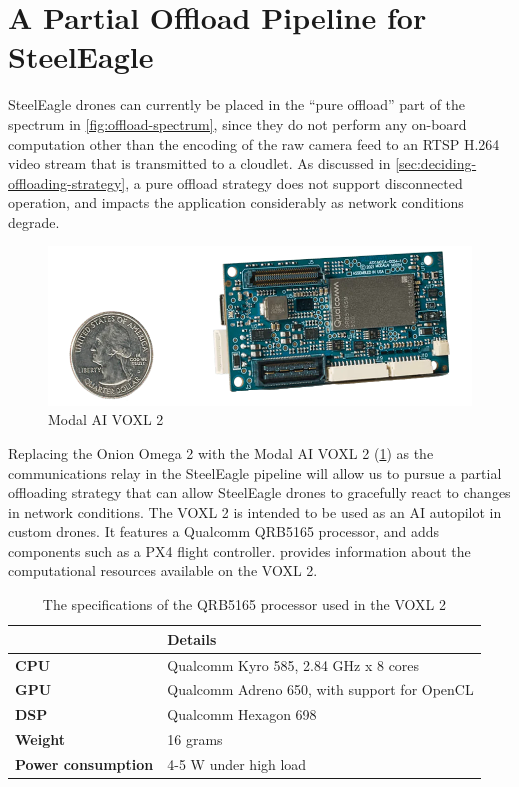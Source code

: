 \section{A Partial Offload Pipeline for SteelEagle}

SteelEagle drones can currently be placed in the ``pure offload'' part of the
spectrum in \cref{fig:offload-spectrum}, since they do not perform any on-board
computation other than the encoding of the raw camera feed to an RTSP H.264
video stream that is transmitted to a cloudlet. As discussed in
\cref{sec:deciding-offloading-strategy}, a pure offload strategy does not
support disconnected operation, and impacts the application considerably as
network conditions degrade.

\begin{figure}[htbp]
\centerline{\includegraphics[width = .5\textwidth]{figs/voxl2.png}}
\caption{Modal AI VOXL 2}
\label{fig:voxl2}
\end{figure}

Replacing the Onion Omega 2 with the Modal AI VOXL 2 (\cref{fig:voxl2}) as the
communications relay in the SteelEagle pipeline will allow us to pursue a
partial offloading strategy that can allow SteelEagle drones to gracefully
react to changes in network conditions. The VOXL 2 is intended to be used as an
AI autopilot in custom drones. It features a Qualcomm QRB5165 processor, and
adds components such as a PX4 flight controller. 
provides information about the computational resources available on the VOXL 2.

\begin{table}
    \centering
    \begin{tabular}{@{}ll@{}}
        \toprule
        \textbf{} & \textbf{Details}\\
        \midrule
        \textbf{CPU} & Qualcomm Kyro 585, 2.84 GHz x 8 cores\\
        \textbf{GPU} & Qualcomm Adreno 650, with support for OpenCL\\
        \textbf{DSP} & Qualcomm Hexagon 698\\
        \textbf{Weight} & 16 grams\\
        \textbf{Power consumption} & 4-5 W under high load\\
        \bottomrule
    \end{tabular}
    \caption{The specifications of the QRB5165 processor used in the VOXL 2}
    \label{tab:voxl2-specs}
\end{table}
